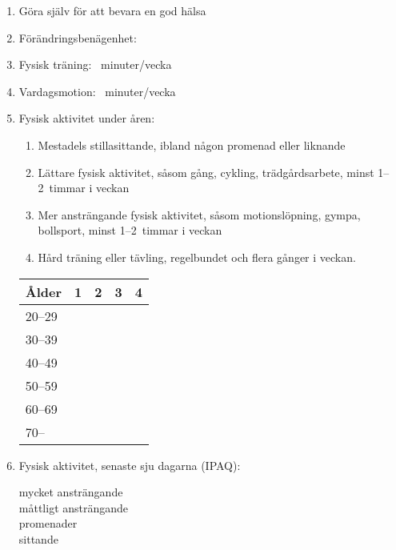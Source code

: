 \documentclass[a4paper,twocolumn,swedish,11pt]{article}
\begin{document}
\begin{enumerate}
	\item Göra själv för att bevara en god hälsa

	\item Förändringsbenägenhet: {\footnotesize{}}

	\item Fysisk träning: {\footnotesize {}~minuter/vecka}

	\item Vardagsmotion: {\footnotesize {}~minuter/vecka}

	\item Fysisk aktivitet under åren:

		{\footnotesize\begin{enumerate}
			\item Mestadels stillasittande, ibland någon promenad eller liknande
			\item Lättare fysisk aktivitet, såsom gång, cykling, trädgårdsarbete, minst 1--2~timmar i veckan
			\item Mer ansträngande fysisk aktivitet, såsom motionslöpning, gympa, bollsport, minst 1--2~timmar i veckan
			\item Hård träning eller tävling, regelbundet och flera gånger i veckan.
		\end{enumerate}

		\begin{center}
			\begin{tabular}{lcccc}
				Ålder&1&2&3&4\\\hline
				20--29&&&&\\
				30--39&&&&\\
				40--49&&&&\\
				50--59&&&&\\
				60--69&&&&\\
				70--  &&&&
			\end{tabular}
		\end{center}}

	\item Fysisk aktivitet, senaste sju dagarna (IPAQ):

		{\footnotesize\begin{description}
			\item[mycket ansträngande]

			\item[måttligt ansträngande]

			\item[promenader]

			\item[sittande]
		\end{description}}


\end{enumerate}
\end{document}
